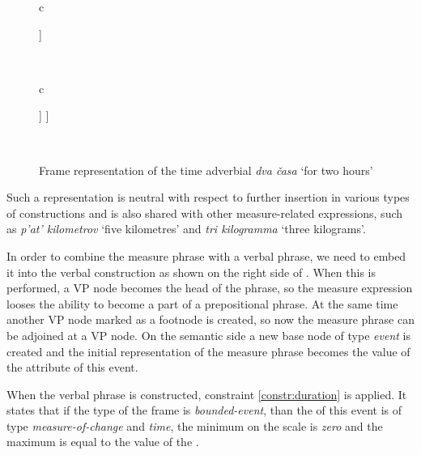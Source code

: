\begin{figure}
\begin{tabular}[b]{c}
\begin{forest}
[NumP\textsuperscript{[I=\textbf{f}]}
[Num] [N]
]
\end{forest}\\
\end{tabular}\hspace{2cm}
\begin{tabular}[b]{c}
\begin{forest}
[VP\textsuperscript{[E=\textbf{e}]}
  [VP*]
  [NumP\textsuperscript{[I=\textbf{f}]}
    [Num] [N]
  ]
]
\end{forest}\\
\end{tabular}
\caption{Frame representation of the time adverbial \textit{dva \v{c}asa} `for two hours' \label{frame:2hours}}
\end{figure}

Such a representation is neutral with respect to further insertion in various types of constructions and is also shared with other measure-related expressions, such as \textit{p'at' kilometrov} `five kilometres' and \textit{tri kilogramma} `three kilograms'.

In order to combine the measure phrase with a verbal phrase, we need to embed it into the verbal construction as shown on the right side of . When this is performed, a VP node becomes the head of the phrase, so the measure expression looses the ability to become a part of a prepositional phrase. At the same time another VP node marked as a footnode is created, so now the measure phrase can be adjoined at a VP node.  On the semantic side a new base node of type \textit{event} is created and the initial representation of the measure phrase becomes the value of the \DURATION attribute of this event.

When the verbal phrase is constructed, constraint \ref{constr:duration} is applied. It states that if the type of the frame is \textit{bounded-event}, than the  of this event is of type \textit{measure-of-change} and \textit{time}, the minimum on the scale is \textit{zero} and the maximum is equal to the value of the .

